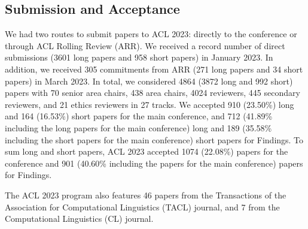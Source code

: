 



\subsection*{Submission and Acceptance}
We had two routes to submit papers to ACL 2023: directly to the conference or through ACL Rolling Review (ARR). We received a record number of direct submissions (3601 long papers and 958 short papers) in January 2023. In addition, we received 305 commitments from ARR (271 long papers and 34 short papers) in March 2023. In total, we considered 4864 (3872 long and 992 short) papers with 70 senior area chairs, 438 area chairs, 4024 reviewers, 445 secondary reviewers, and 21 ethics reviewers in 27 tracks. We accepted 910 (23.50\%) long and 164 (16.53\%) short papers for the main conference, and 712 (41.89\% including the long papers for the main conference) long and 189 (35.58\% including the short papers for the main conference) short papers for Findings. To sum long and short papers, ACL 2023 accepted 1074 (22.08\%) papers for the conference and 901 (40.60\% including the papers for the main conference) papers for Findings.

The ACL 2023 program also features 46 papers from the Transactions of the Association for Computational Linguistics (TACL) journal, and 7 from the Computational Linguistics (CL) journal.

